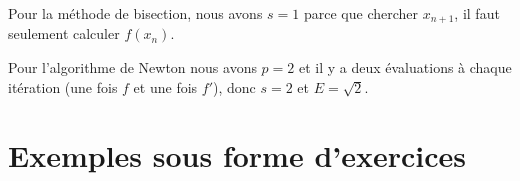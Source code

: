 \begin{example}[Bisection]
	Pour la méthode de bisection, nous avons \( s=1\) parce que chercher \( x_{n+1}\), il faut seulement calculer \( f(x_n)\).
\end{example}

\begin{example}[Newton]
	Pour l'algorithme de Newton nous avons \( p=2\) et il y a deux évaluations à chaque itération (une fois \( f\) et une fois \( f'\)), donc \( s=2\) et \( E=\sqrt{ 2 }\).
\end{example}

\section{Exemples sous forme d'exercices}


